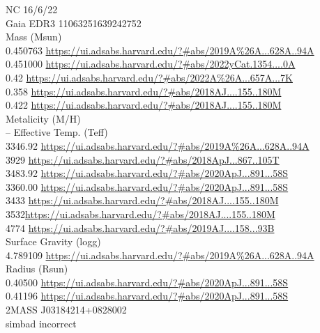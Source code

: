 NC 16/6/22\\

Gaia EDR3 11063251639242752\\

Mass (Msun)\\
0.450763 \url{https://ui.adsabs.harvard.edu/?#abs/2019A%26A...628A..94A}\\
0.451000  \url{https://ui.adsabs.harvard.edu/?#abs/2022yCat.1354....0A}\\
0.42 \url{https://ui.adsabs.harvard.edu/?#abs/2022A%26A...657A...7K}\\
0.358 \url{https://ui.adsabs.harvard.edu/?#abs/2018AJ....155..180M}\\
0.422	\url{https://ui.adsabs.harvard.edu/?#abs/2018AJ....155..180M}\\
Metalicity (M/H)\\
--
Effective Temp. (Teff)\\
3346.92 \url{https://ui.adsabs.harvard.edu/?#abs/2019A%26A...628A..94A}\\
3929 \url{https://ui.adsabs.harvard.edu/?#abs/2018ApJ...867..105T}\\
3483.92 \url{https://ui.adsabs.harvard.edu/?#abs/2020ApJ...891...58S}\\
3360.00 \url{https://ui.adsabs.harvard.edu/?#abs/2020ApJ...891...58S}\\
3433 \url{https://ui.adsabs.harvard.edu/?#abs/2018AJ....155..180M}\\
3532\url{https://ui.adsabs.harvard.edu/?#abs/2018AJ....155..180M}\\
4774 \url{https://ui.adsabs.harvard.edu/?#abs/2019AJ....158...93B}\\
Surface Gravity (logg)\\
4.789109 \url{https://ui.adsabs.harvard.edu/?#abs/2019A%26A...628A..94A}\\
Radius (Rsun)\\
0.40500 \url{https://ui.adsabs.harvard.edu/?#abs/2020ApJ...891...58S}\\
0.41196 \url{https://ui.adsabs.harvard.edu/?#abs/2020ApJ...891...58S}\\

2MASS J03184214+0828002\\
simbad incorrect\\